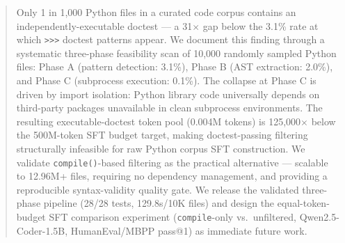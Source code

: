 \begin{abstract}
Only 1 in 1,000 Python files in a curated code corpus contains an independently-executable
doctest --- a 31$\times$ gap below the 3.1\% rate at which \texttt{>>>} doctest patterns appear.
We document this finding through a systematic three-phase feasibility scan of 10,000 randomly
sampled Python files: Phase A (pattern detection: 3.1\%), Phase B (AST extraction: 2.0\%), and
Phase C (subprocess execution: 0.1\%). The collapse at Phase C is driven by import isolation:
Python library code universally depends on third-party packages unavailable in clean subprocess
environments. The resulting executable-doctest token pool (0.004M tokens) is 125,000$\times$
below the 500M-token SFT budget target, making doctest-passing filtering structurally infeasible
for raw Python corpus SFT construction. We validate \texttt{compile()}-based filtering as the
practical alternative --- scalable to 12.96M+ files, requiring no dependency management, and
providing a reproducible syntax-validity quality gate. We release the validated three-phase
pipeline (28/28 tests, 129.8s/10K files) and design the equal-token-budget SFT comparison
experiment (\texttt{compile}-only vs.\ unfiltered, Qwen2.5-Coder-1.5B, HumanEval/MBPP pass@1)
as immediate future work.
\end{abstract}

